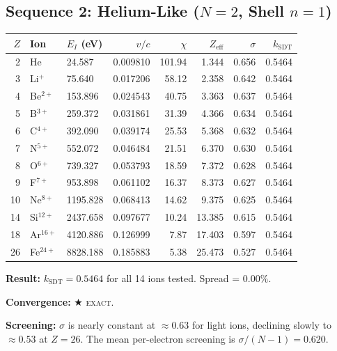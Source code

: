 \subsection{Sequence 2: Helium-Like ($N = 2$, Shell $n = 1$)}

\begin{center}
\small
\begin{tabular}{rllrrrrr}
\hline
$Z$ & Ion & $E_I$ (eV) & $v/c$ & $\chi$ & $Z_{\text{eff}}$ & $\sigma$ & $k_{\text{SDT}}$ \\
\hline
 2 & He          &   24.587 & 0.009810 & 101.94 & 1.344 & 0.656 & 0.5464 \\
 3 & Li$^+$      &   75.640 & 0.017206 &  58.12 & 2.358 & 0.642 & 0.5464 \\
 4 & Be$^{2+}$   &  153.896 & 0.024543 &  40.75 & 3.363 & 0.637 & 0.5464 \\
 5 & B$^{3+}$    &  259.372 & 0.031861 &  31.39 & 4.366 & 0.634 & 0.5464 \\
 6 & C$^{4+}$    &  392.090 & 0.039174 &  25.53 & 5.368 & 0.632 & 0.5464 \\
 7 & N$^{5+}$    &  552.072 & 0.046484 &  21.51 & 6.370 & 0.630 & 0.5464 \\
 8 & O$^{6+}$    &  739.327 & 0.053793 &  18.59 & 7.372 & 0.628 & 0.5464 \\
 9 & F$^{7+}$    &  953.898 & 0.061102 &  16.37 & 8.373 & 0.627 & 0.5464 \\
10 & Ne$^{8+}$   & 1195.828 & 0.068413 &  14.62 & 9.375 & 0.625 & 0.5464 \\
14 & Si$^{12+}$  & 2437.658 & 0.097677 &  10.24 &13.385 & 0.615 & 0.5464 \\
18 & Ar$^{16+}$  & 4120.886 & 0.126999 &   7.87 &17.403 & 0.597 & 0.5464 \\
26 & Fe$^{24+}$  & 8828.188 & 0.185883 &   5.38 &25.473 & 0.527 & 0.5464 \\
\hline
\end{tabular}
\end{center}

\textbf{Result:} $k_{\text{SDT}} = 0.5464$ for all 14 ions tested.  Spread = $0.00\%$.

\textbf{Convergence:} $\bigstar$ \textsc{exact}.

\textbf{Screening:} $\sigma$ is nearly constant at $\approx 0.63$ for light ions, declining slowly to $\approx 0.53$ at $Z = 26$.  The mean per-electron screening is $\sigma/(N{-}1) = 0.620$.


